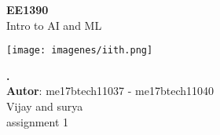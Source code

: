 \documentclass[12pt,a4paper,oneside]{report}
\begin{document}
\marginsize{3.0cm}{3.0cm}{4.0cm}{3.0cm}
\renewcommand*{\contentsname}{Problem}
\begin{titlepage}
 
\begin{center}
 
 {\huge \bf EE1390}\\
 
{\Large Intro to AI and ML}\\[2.0cm]


\begin{center}
\texttt{[image: imagenes/iith.png]}
\end{center}

\vspace{1cm}
\title{} 
{\bf \large . }\\[1cm] 
{{\bf Autor}: me17btech11037 - me17btech11040 }\\[2.0cm] 
{\large Vijay and surya}\\[0.2cm] 
{assignment 1}
\end{center}

\end{titlepage}
\end{document}
